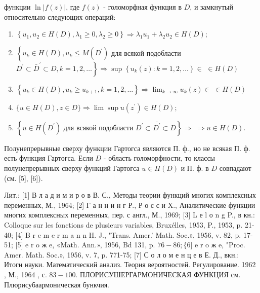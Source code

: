 \documentclass[10pt]{article}
\begin{document}
функции $\ln |f(z)|$, где $f(z)$ - голоморфная функция в $D$, и замкнутый относительно следующих операций:



\begin{enumerate}

  \item $\left\{u_{1}, u_{2} \in H(D), \lambda_{1} \geqslant 0, \lambda_{2} \geqslant 0\right\} \Rightarrow \lambda_{1} u_{1}+\lambda_{2} u_{2} \in H(D)$;



  \item $\left\{u_{k} \in H(D), u_{k} \leqslant M\left(D^{\prime}\right)\right.$ для всякой подобласти $\left.D^{\prime} \subset \bar{D}^{\prime} \subset D, k=1,2, \ldots\right\} \Rightarrow \sup \left\{u_{k}(z): k=1,2, \ldots\right\} \in$ $\in H(D)$



  \item $\left\{u_{k} \in H(D), u_{k} \geqslant u_{k+1}, k=1,2, \ldots\right\} \Rightarrow \lim _{k \rightarrow \infty} u_{k}(z) \in$ $\in H(D)$



  \item $\{u \in H(D), z \in D\} \Rightarrow \lim \sup u\left(z^{\prime}\right) \in H(D)$;



  \item $\left\{u \in H\left(D^{\prime}\right)\right.$ для всякой подобласти $\left.D^{\prime} \subset \overline{D^{\prime}} \subset D\right\} \Rightarrow$ $\Rightarrow u \in H(D)$.



\end{enumerate}



Полунепрерывные сверху функции Гартогса являются П. ф., но не всякая П. ф. есть функция Гартогса. Если $D$ - область голоморфности, то классы полунепрерывных сверху функций Гартогса $u \in H(D)$ и П. ф. в $D$ совпадают (см. [5], [6]).



Лит.: [1] В л а д и м и р о в В. С., Методы теории функций многих комплексных переменных, М., 1964; [2] Г а н н и н г Р., Р о с с и X., Аналитические функции многих комплексных переменных, пер. с англ., М., 1969; [3] L е l о n g P., в кн.: Colloque sur les fonctions de plusieurs variables, Bruxélles, 1953, P., 1953, p. 21-40; [4] B r e m e r m a n n H. J., "Trans. Amer.' Math. Soc.», 1956, v. 82, p. 17-51; [5] e r o ж e, «Math. Ann.», 1956, Bd 131, p. $76-86 ;\{6]$ e r o ж e, "Proc. Amer. Math. Soc.», 1956, v. 7, p. 771-75; [7] С о л о м е н ц е в Е. Д., вкн.: Итоги науки. Математический анализ. Теория вероятностей. Регулирование. 1962 , М., 1964 , с. $83-100$. ПЛОРИСУШЕРГАРМОНИЧЕСКАЯ ФУНКЦИЯ см. Плюрисубаармоническая бункчия.
\end{document}
